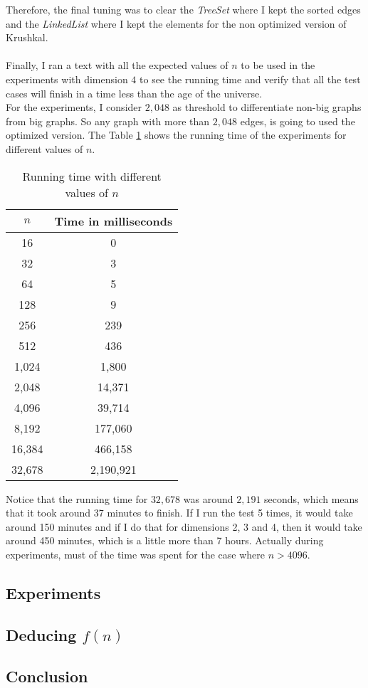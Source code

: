 \documentclass[tikz, 12pt]{scrartcl}
\begin{document}
Therefore, the final tuning was to clear the \textit{TreeSet} where I kept the sorted edges and the \textit{LinkedList} where I kept the elements for the non optimized version of Krushkal.\\ 
\\
Finally, I ran a text with all the expected values of $n$ to be used in the experiments with dimension $4$ to see the running time and verify that all the test cases will finish in a time less than the age of the universe.\\
For the experiments, I consider $2,048$ as threshold to differentiate non-big graphs from big graphs. So any graph with more than $2,048$ edges, is going to used the optimized version. The Table \ref{goodRunningTime} shows the running time of the experiments for different values of $n$.

\begin{table}[ht!]
\centering
\caption{\label{goodRunningTime}Running time with different values of $n$}
\begin{tabular}{|c|c|}
\hline
$n$	&	Time in milliseconds	\\
\hline
16		&              0 \\
32		&	          3\\
64		&		   5\\
128		&              9 \\
256		&		239\\
512		&	      436\\
1,024	&	    1,800\\
2,048	&	  14,371\\
4,096	&	  39,714\\
8,192	&	177,060	\\
16,384	&	466,158\\
32,678	&  2,190,921\\
\hline
\end{tabular}
\end{table}

Notice that the running time for $32,678$ was around $2,191$ seconds, which means that it took around 37 minutes to finish. If I run the test 5 times, it would take around 150 minutes and if I do that for dimensions 2, 3 and 4, then it would take around 450 minutes, which is a little more than 7 hours. Actually during experiments, must of the time was spent for the case where $n > 4096$.

\subsection{Experiments}



\subsection{Deducing $f(n)$}

\subsection{Conclusion}
\end{document}
